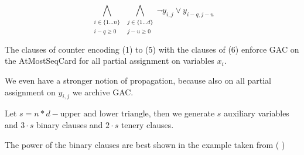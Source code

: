 \documentclass[]{llncs}
\newcommand{\TODO}[1]{ {\color{red}{#1} }}
\begin{document}
\begin{equation}
    \bigwedge_{\substack{i \in \{1 \ldots n\} \\ i-q \geq 0}}
    \bigwedge_{\substack{j\in\{1\ldots d\}\\ j-u \geq 0}}
    \neg y_{i,j} \vee y_{i-q,j-u}
\end{equation}               

\begin{theorem}
    The clauses of counter encoding (1) to (5) with the clauses of (6)
    enforce GAC on the AtMostSeqCard for all partial assignment on
    variables $x_{i}$. 
\end{theorem}

We even have a stronger notion of propagation, because also on all
partial assignment on $y_{i,j}$ we archive GAC. 

\TODO{Find precise size of the encoding:} Let $s = n*d-\text{upper and
lower triangle}$, then we generate $s$ auxiliary variables and $3\cdot
s$ binary clauses and $2\cdot s$ tenery clauses. 

The power of the binary clauses are best shown in the example taken from
(\TODO{ref})
\end{document}
